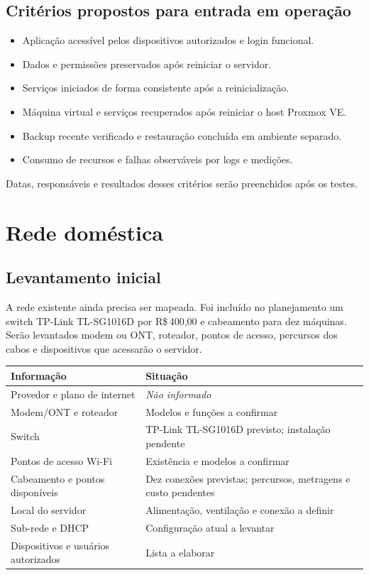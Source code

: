 \documentclass[11pt,a4paper,oneside]{report}
\newcommand{\naoinformado}{\textit{Não informado}}
\newcommand{\dinheiro}[1]{R\$\,#1}
\begin{document}
\section{Critérios propostos para entrada em operação}
\begin{itemize}
\item Aplicação acessível pelos dispositivos autorizados e login funcional.
\item Dados e permissões preservados após reiniciar o servidor.
\item Serviços iniciados de forma consistente após a reinicialização.
\item Máquina virtual e serviços recuperados após reiniciar o host Proxmox VE.
\item Backup recente verificado e restauração concluída em ambiente separado.
\item Consumo de recursos e falhas observáveis por logs e medições.
\end{itemize}
Datas, responsáveis e resultados desses critérios serão preenchidos após os testes.

\chapter{Rede doméstica}
\section{Levantamento inicial}
A rede existente ainda precisa ser mapeada. Foi incluído no planejamento um
switch TP-Link TL-SG1016D por \dinheiro{400,00} e cabeamento para dez máquinas.
Serão levantados modem ou ONT, roteador, pontos de acesso, percursos dos cabos
e dispositivos que acessarão o servidor.

\begin{tabularx}{\textwidth}{@{}p{4cm}Y@{}}
\toprule
Informação & Situação \\
\midrule
Provedor e plano de internet & \naoinformado \\
Modem/ONT e roteador & Modelos e funções a confirmar \\
Switch & TP-Link TL-SG1016D previsto; instalação pendente \\
Pontos de acesso Wi-Fi & Existência e modelos a confirmar \\
Cabeamento e pontos disponíveis & Dez conexões previstas; percursos, metragens e custo pendentes \\
Local do servidor & Alimentação, ventilação e conexão a definir \\
Sub-rede e DHCP & Configuração atual a levantar \\
Dispositivos e usuários autorizados & Lista a elaborar \\
\bottomrule
\end{tabularx}
\end{document}
